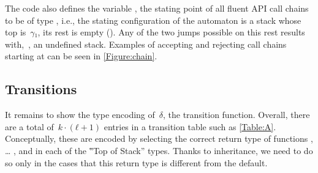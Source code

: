 The code also defines the  variable , the stating point
of all fluent API call chains to be of type , i.e.,
  the stating configuration of the automaton is a stack whose top is~$γ₁$,
  its rest is empty ().
Any of the two jumps possible on this rest results with,~,
  an undefined stack.
Examples of accepting and rejecting call chains starting at 
  can be seen in \cref{Figure:chain}.

\subsection{Transitions}
It remains to show the type encoding of~$δ$,
  the transition function.
Overall, there are a total of~$k·(ℓ+1)$
  entries in a transition table such as \cref{Table:A}.
Conceptually, these are encoded by selecting the correct return
  type of functions , … , and \cc{\$()} in each of the ‟Top of Stack” types.
Thanks to inheritance, we need to do so only in the cases that this return type is different from the
  default.

